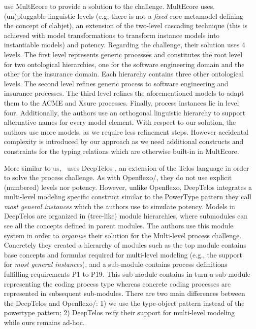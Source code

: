 \cite{multiecore2019} use MultEcore \citep{multecore2016} to provide a solution to the challenge. MultEcore uses, (un)pluggable linguistic levels (e.g, there is not a \emph{fixed} core metamodel defining the concept of clabjet), an extension of the two-level cascading technique \citep{atkinson2005concepts} (this is achieved with model transformations to transform instance models into instantiable models) and potency. Regarding the challenge, their solution uses 4 levels. 
The first level represents generic processes and constitutes the root level for two ontological hierarchies, one for the software engineering domain and the other for the insurance domain. Each hierarchy contains three other ontological levels. The second level refines generic process to software engineering and insurance processes. The third level refines the aforementioned models to adapt them to the ACME and Xsure processes. Finally, process instances lie in level four. Additionally, the authors use an orthogonal linguistic hierarchy to support alternative names for every model element. 
With respect to our solution, the authors use more models, as we require less refinement steps. However accidental complexity is introduced by our approach as we need additional constructs and constraints for the typing relations which are otherwise built-in in MultEcore. 



More similar to us,~\citet{deeptelos2019} uses DeepTelos \parencite{deeptelos2016}, an extension of the Telos language \parencite{telos1990} in order to solve the process challenge. As with Openflexo/\FML, they do not use explicit (numbered) levels nor potency. However, unlike Openflexo, DeepTelos integrates a multi-level modeling specific construct similar to the PowerType \parencite{atkinson2001essence} pattern they call \emph{most general instances} which the authors use to simulate potency. Models in DeepTelos are organized in (tree-like) module hierarchies, where submodules can see all the concepts defined in parent modules. The authors use this module system in order to \emph{organize} their solution for the Multi-level process challenge. Concretely they created a hierarchy of modules such as the top module contains base concepts and formulas required for multi-level modeling (e.g., the support for \emph{most general instances}), and a sub-module contains process definitions fulfilling requirements P1 to P19. This sub-module contains in turn a sub-module representing the coding process type whereas concrete coding processes are represented in subsequent sub-modules. There are two main differences between the DeepTelos and Openflexo/\FML: 1) we use the type-object pattern instead of the powertype pattern; 2) DeepTelos reify their support for multi-level modeling while ours remains ad-hoc.

